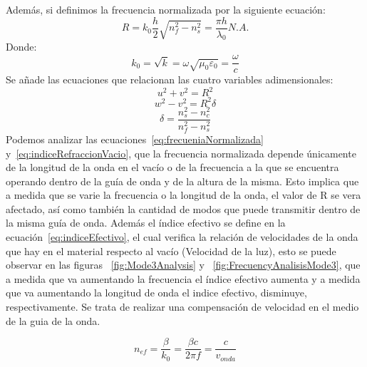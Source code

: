 \documentclass[letterpaper, 10 pt, conference]{ieeeconf}  %
\begin{document}
Adem\'as, si definimos la frecuencia normalizada por la siguiente ecuaci\'on:
\begin{equation}
\label{eq:frecueniaNormalizada}
R = {k_0}\frac{h}{2}\sqrt {n_f^2 - n_s^2}  = \frac{{\pi h}}{{{\lambda _0}}}N.A.
\end{equation}
Donde:
\begin{equation}
\label{eq:indiceRefraccionVacio}
{k_0} = \sqrt k  = \omega \sqrt {{\mu _0}{\varepsilon _0}}  = \frac{\omega }{c}
\end{equation}
Se a\~{n}ade las ecuaciones que relacionan las cuatro variables adimensionales:
\begin{equation}
\label{eq:ecuacionNormalizada}
{u^2} + {v^2} = {R^2}
\end{equation}
\begin{equation}
\label{eq:ecuacionNormalizada2}
{w^2} - {v^2} = {R^2}\delta
\end{equation}
\begin{equation}
\label{eq:parametroAsimetricol}
\delta  = \frac{{n_s^2 - n_c^2}}{{n_f^2 - n_s^2}}
\end{equation}
Podemos analizar las ecuaciones~\eqref{eq:frecueniaNormalizada} y~\eqref{eq:indiceRefraccionVacio}, que la frecuencia normalizada depende \'unicamente de la longitud de la onda en el vac\'io o de la frecuencia a la que se encuentra operando dentro de la gu\'ia de onda y de la altura de la misma. Esto implica que a medida que se varie la frecuencia o la longitud de la onda, el valor de R se vera afectado, as\'i como tambi\'en la cantidad de modos que puede transmitir dentro de la misma gu\'ia de onda. Adem\'as el \'indice efectivo se define en la ecuaci\'on~\eqref{eq:indiceEfectivo}, el cual verifica la relaci\'on de velocidades de la onda que hay en el material respecto al vac\'io (Velocidad de la luz), esto se puede observar en las figuras ~\ref{fig:Mode3Analysis} y ~\ref{fig:FrecuencyAnalisisMode3}, que a medida que va aumentando la frecuencia el \'indice efectivo aumenta y a medida que va aumentando la longitud de onda el indice efectivo, disminuye, respectivamente. Se trata de realizar una compensaci\'on de velocidad en el medio de la guia de la onda.

\begin{equation}
\label{eq:indiceEfectivo}
{n_{ef}} = \frac{\beta }{{{k_0}}} = \frac{{\beta c}}{{2\pi f}} = \frac{c}{{{v_{onda}}}}
\end{equation}
\end{document}
